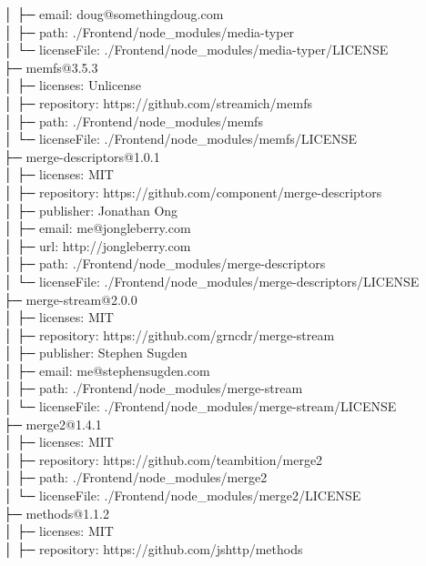 \documentclass[
    paper=a4,
    twoside=false,
    parskip=half,
    listof=entryprefix,
    listof=totoc,
    index=totoc,
    bibliography=totoc,
    headsepline,
]{scrbook}
\begin{document}
    │  ├─ email: doug@somethingdoug.com\\
    │  ├─ path: ./Frontend/node\_modules/media-typer\\
    │  └─ licenseFile: ./Frontend/node\_modules/media-typer/LICENSE\\
    ├─ memfs@3.5.3\\
    │  ├─ licenses: Unlicense\\
    │  ├─ repository: https://github.com/streamich/memfs\\
    │  ├─ path: ./Frontend/node\_modules/memfs\\
    │  └─ licenseFile: ./Frontend/node\_modules/memfs/LICENSE\\
    ├─ merge-descriptors@1.0.1\\
    │  ├─ licenses: MIT\\
    │  ├─ repository: https://github.com/component/merge-descriptors\\
    │  ├─ publisher: Jonathan Ong\\
    │  ├─ email: me@jongleberry.com\\
    │  ├─ url: http://jongleberry.com\\
    │  ├─ path: ./Frontend/node\_modules/merge-descriptors\\
    │  └─ licenseFile: ./Frontend/node\_modules/merge-descriptors/LICENSE\\
    ├─ merge-stream@2.0.0\\
    │  ├─ licenses: MIT\\
    │  ├─ repository: https://github.com/grncdr/merge-stream\\
    │  ├─ publisher: Stephen Sugden\\
    │  ├─ email: me@stephensugden.com\\
    │  ├─ path: ./Frontend/node\_modules/merge-stream\\
    │  └─ licenseFile: ./Frontend/node\_modules/merge-stream/LICENSE\\
    ├─ merge2@1.4.1\\
    │  ├─ licenses: MIT\\
    │  ├─ repository: https://github.com/teambition/merge2\\
    │  ├─ path: ./Frontend/node\_modules/merge2\\
    │  └─ licenseFile: ./Frontend/node\_modules/merge2/LICENSE\\
    ├─ methods@1.1.2\\
    │  ├─ licenses: MIT\\
    │  ├─ repository: https://github.com/jshttp/methods\\
\end{document}
